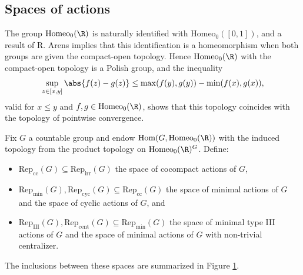 \documentclass[reqno]{amsart}
\begin{document}
\subsection{Spaces of actions} \label{subsection:spaces} The group $\mathrm{Homeo}_0(\R)$ is naturally identified with $\mathrm{Homeo}_0([0,1])$, and a result of R. Arens \cite[Theorems 1 \& 5]{Arens1946} implies that this identification is a homeomorphism when both groups are given the compact-open topology. Hence $\mathrm{Homeo}_0(\R)$ with the compact-open topology is a Polish group, and the inequality
\[
        \sup_{z \in [x,y]} \abs{f(z) - g(z)} \leq \max(f(y), g(y)) - \min(f(x), g(x)),
\]
valid for $x\leq y$ and $f,g\in \mathrm{Homeo}_0(\R)$, shows that this topology coincides with the topology of pointwise convergence. %

Fix $G$ a countable group and endow $\mathrm{Hom}(G, \mathrm{Homeo}_0(\R))$ with the induced topology from the product topology on $\mathrm{Homeo}_0(\R)^G$. Define:
\begin{itemize}
        \item $\mathrm{Rep}_\mathrm{cc}(G) \subseteq \mathrm{Rep}_\mathrm{irr}(G)$ the space of cocompact actions of $G$,
        \item $\mathrm{Rep}_\mathrm{min}(G), \mathrm{Rep}_\mathrm{cyc}(G) \subseteq \mathrm{Rep}_\mathrm{cc}(G)$ the space of minimal actions of $G$ and the space of cyclic actions of $G$, and
        \item $\mathrm{Rep}_\mathrm{III}(G), \mathrm{Rep}_\mathrm{cent}(G) \subseteq \mathrm{Rep}_\mathrm{min}(G)$ the space of minimal type III actions of $G$ and the space of minimal actions of $G$ with non-trivial centralizer.
\end{itemize}
The inclusions between these spaces are summarized in Figure \ref{fig:inclusions}.

\begin{figure}[h] 
\centering
{}
\caption{}
\label{fig:inclusions}
\end{figure}
\end{document}
